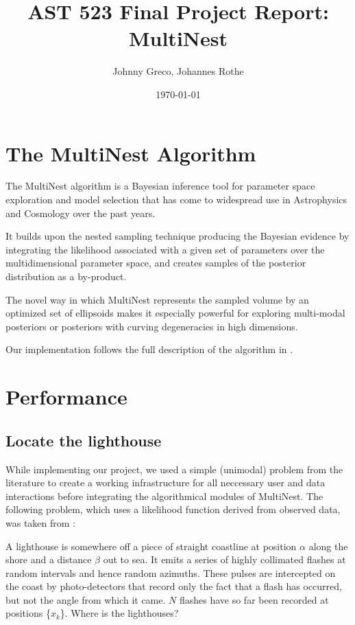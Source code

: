 \documentclass{article}
\title{AST 523 Final Project Report: MultiNest}
\date{\today}
\author{Johnny Greco, Johannes Rothe}
\begin{document}
\maketitle
\section{The MultiNest Algorithm}
The MultiNest algorithm is a Bayesian inference tool for parameter space exploration and model selection that has come to widespread use in Astrophysics and Cosmology over the past years. 

It builds upon the nested sampling technique producing the Bayesian evidence by integrating the likelihood associated with a given set of parameters over the multidimensional parameter space, and creates samples of the posterior distribution as a by-product.

The novel way in which MultiNest represents the sampled volume by an optimized set of ellipsoids makes it especially powerful for exploring multi-modal posteriors or posteriors with curving degeneracies in high dimensions.

Our implementation follows the full description of the algorithm in \cite{2009MNRAS.398.1601F}.
\section{Performance}

\subsection{Locate the lighthouse}

While implementing our project, we used a simple (unimodal) problem from the literature to create a working infrastructure for all neccessary user and data interactions before integrating the algorithmical modules of MultiNest.  The following problem, which uses a likelihood function derived from observed data, was taken from \cite{Siv2006}:

\vspace{0.2cm}

\begin{adjustwidth*}{1.2cm}{2.cm}
A lighthouse is somewhere off a piece of straight coastline at position $\alpha$ along the shore and a distance $\beta$ out to sea. It emits a series of highly collimated flashes at random intervals and hence random azimuths. These pulses are intercepted on the coast by photo-detectors that record only the fact that a flash has occurred, but not the angle from which it came. $N$ flashes have so far been recorded at positions \{$x_k$\}. Where is the lighthouses?
 \end{adjustwidth*}
 
\end{document}
